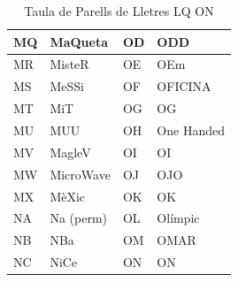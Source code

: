 \begin{table}[ht]
\begin{tabular}{|l|l|l|l|}
        MQ & MaQueta        & OD & ODD                  \\ \hline
        MR & MisteR         & OE & OEm                  \\ \hline
        MS & MeSSi          & OF & OFICINA              \\ \hline
        MT & MiT            & OG & OG                   \\ \hline
        MU & MUU            & OH & One Handed           \\ \hline
        MV & MagleV         & OI & OI                   \\ \hline
        MW & MicroWave      & OJ & OJO                  \\ \hline
        MX & MèXic          & OK & OK                   \\ \hline
        NA & Na (perm)      & OL & Olímpic              \\ \hline
        NB & NBa            & OM & OMAR                 \\ \hline
        NC & NiCe           & ON & ON                   \\ \hline
    \end{tabular}
    \caption{Taula de Parells de Lletres LQ \rightarrow ON}
    \label{tla:lletres-5}
\end{table}

